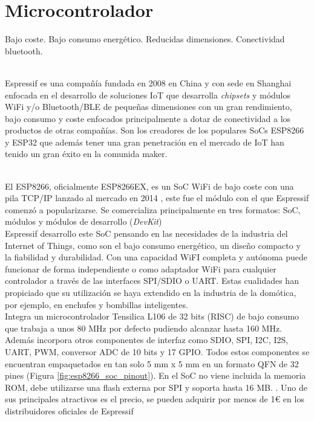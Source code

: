 \documentclass[../proyecto.tex]{subfiles}
\begin{document}
\section{Microcontrolador}

Bajo coste.
Bajo consumo energético.
Reducidas dimensiones.
Conectividad bluetooth.

\\
Espressif es una compañía fundada en 2008 en China y con sede en Shanghai enfocada en el desarrollo de soluciones IoT que desarrolla \textit{chipsets} y módulos WiFi y/o Bluetooth/BLE de pequeñas dimensiones con un gran rendimiento, bajo consumo y coste enfocados principalmente a dotar de conectividad a los productos de otras compañías. Son los creadores de los populares SoCs ESP8266 y ESP32 que además tener una gran penetración en el mercado de IoT han tenido un gran éxito en la comunida maker.

\\

El ESP8266, oficialmente ESP8266EX, es un SoC WiFi de bajo coste con una pila TCP/IP lanzado al mercado en 2014 \cite{esp8266_overview}, este fue el módulo con el que Espressif comenzó a popularizarse. Se comercializa principalmente en tres formatos: SoC, módulos y módulos de desarrollo (\textit{DevKit})\\

Espressif desarrollo este SoC pensando en las necesidades de la industria del Internet of Things, como son el bajo consumo energético, un diseño compacto y la fiabilidad y durabilidad. Con una capacidad WiFI completa y autónoma puede funcionar de forma independiente o como adaptador WiFi para cualquier controlador a través de las interfaces SPI/SDIO o UART. Estas cualidades han propiciado que su utilización se haya extendido en la industria de la domótica, por ejemplo, en enchufes y bombillas inteligentes. \\

Integra un microcontrolador Tensilica L106 de 32 bits (RISC) de bajo consumo que trabaja a unos 80 MHz por defecto pudiendo alcanzar hasta 160 MHz. Además incorpora otros componentes de interfaz como SDIO, SPI, I2C, I2S, UART, PWM, conversor ADC de 10 bits y 17 GPIO. Todos estos componentes se encuentran empaquetados en tan solo 5 mm x 5 mm en un formato QFN de 32 pines (Figura \ref{fig:esp8266_soc_pinout}). En el SoC no viene incluida la memoria ROM, debe utilizarse una flash externa por SPI y soporta hasta 16 MB. \cite{esp8266_datasheet}. Uno de sus principales atractivos es el precio, se pueden adquirir por menos de 1€ en los distribuidores oficiales de Espressif \cite{espressif_provider_digikey} \cite{espressif_provider_mouser}\\
\end{document}
